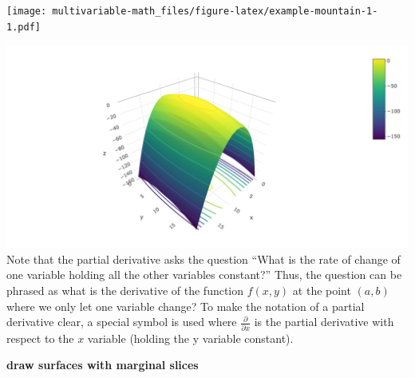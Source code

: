 \documentclass[
]{book}
\newenvironment{Shaded}{\begin{snugshade}}{\end{snugshade}}
\newcommand{\DataTypeTok}[1]{\textcolor[rgb]{0.13,0.29,0.53}{#1}}
\newcommand{\DecValTok}[1]{\textcolor[rgb]{0.00,0.00,0.81}{#1}}
\newcommand{\KeywordTok}[1]{\textcolor[rgb]{0.13,0.29,0.53}{\textbf{#1}}}
\newcommand{\NormalTok}[1]{#1}
\newcommand{\OperatorTok}[1]{\textcolor[rgb]{0.81,0.36,0.00}{\textbf{#1}}}
\newcommand{\OtherTok}[1]{\textcolor[rgb]{0.56,0.35,0.01}{#1}}
\newcommand{\StringTok}[1]{\textcolor[rgb]{0.31,0.60,0.02}{#1}}
\theoremstyle{definition}
\theoremstyle{definition}
\theoremstyle{definition}
\theoremstyle{definition}
\theoremstyle{remark}
\begin{document}
\texttt{[image: multivariable-math\_files/figure-latex/example-mountain-1-1.pdf]}

\begin{Shaded}
\end{Shaded}

\includegraphics[width=1\linewidth]{./webshot-images/contour}
Note that the partial derivative asks the question ``What is the rate of change of one variable holding all the other variables constant?'' Thus, the question can be phrased as what is the derivative of the function \(f(x, y)\) at the point \((a, b)\) where we only let one variable change? To make the notation of a partial derivative clear, a special symbol is used where \(\frac{\partial}{\partial x}\) is the partial derivative with respect to the \(x\) variable (holding the y variable constant).

\textbf{draw surfaces with marginal slices}
\end{document}
